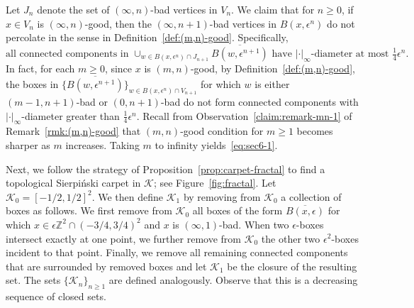 \documentclass[a4paper]{article}
\numberwithin{equation}{section}
\numberwithin{equation}{section}
\renewcommand{\1}{\mathbf{1}}
\begin{document}
Let $J_n$ denote the set of $(\infty, n)$-bad vertices in $V_n$. We claim that for $n \geq 0$, if $x \in V_n$ is $(\infty, n)$-good, then the $(\infty, n+1)$-bad vertices in $B(x,\epsilon^n)$ do not percolate in the sense in Definition~\ref{def:(m,n)-good}. Specifically, 
\begin{equation}\label{eq:sec6-1}
    \mbox{all connected components in } \cup_{w \in B(x,\epsilon^n) \cap J_{n+1}} \overline{B(w, \epsilon^{n+1})} \mbox{ have } |\cdot|_\infty \mbox{-diameter at most } \tfrac{1}{4} \epsilon^n.
\end{equation}
In fact, for each $m \geq 0$, since $x$ is $(m,n)$-good, by Definition~\ref{def:(m,n)-good}, the boxes in $\{ \overline{B(w, \epsilon^{n+1})} \}_{w \in B(x,\epsilon^n) \cap V_{n+1}}$ for which $w$ is either $(m-1, n+1)$-bad or $(0, n+1)$-bad do not form connected components with $|\cdot|_\infty$-diameter greater than $\frac{1}{4} \epsilon^n$. Recall from Observation~\eqref{claim:remark-mn-1} of Remark~\ref{rmk:(m,n)-good} that $(m,n)$-good condition for $m \ge 1$ becomes sharper as $m$ increases. Taking $m$ to infinity yields~\eqref{eq:sec6-1}.

Next, we follow the strategy of Proposition~\ref{prop:carpet-fractal} to find a topological Sierpi\'nski carpet in $\mathcal{K}$; see Figure~\ref{fig:fractal}. Let $\mathcal{K}_0 = [-1/2,1/2]^2$. We then define $\mathcal{K}_1$ by removing from $\mathcal{K}_0$ a collection of boxes as follows. We first remove from $\mathcal{K}_0$ all boxes of the form $\overline{B(x, \epsilon)}$ for which $x \in \epsilon \mathbb{Z}^2 \cap (-3/4,3/4)^2$ and $x$ is $(\infty, 1)$-bad. When two $\epsilon$-boxes intersect exactly at one point, we further remove from $\mathcal{K}_0$ the other two $\epsilon^2$-boxes incident to that point. Finally, we remove all remaining connected components that are surrounded by removed boxes and let $\mathcal{K}_1$ be the closure of the resulting set. The sets $\{\mathcal{K}_n\}_{n \geq 1}$ are defined analogously. Observe that this is a decreasing sequence of closed sets.
\end{document}
